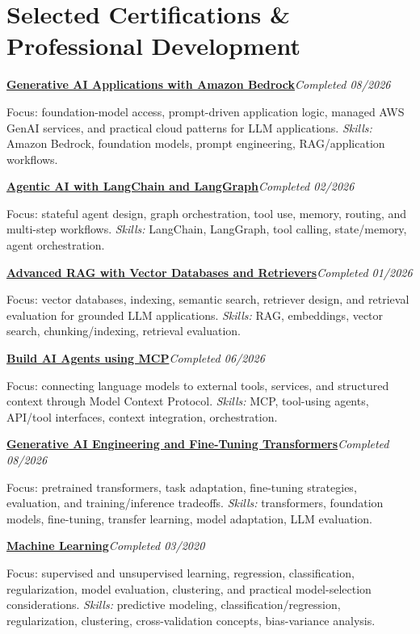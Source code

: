 \documentclass[9pt,letterpaper]{extarticle}
\newcommand{\cert}[3]{\Needspace{4\baselineskip}\textbf{#1}\hfill\textit{#2}\par{\small #3\par}}
\begin{document}
\section{Selected Certifications \& Professional Development}
\cert{\href{https://www.coursera.org/account/accomplishments/verify/3W16P8EE4BJZ}{Generative AI Applications with Amazon Bedrock}}{Completed 08/2026}{Focus: foundation-model access, prompt-driven application logic, managed AWS GenAI services, and practical cloud patterns for LLM applications. \textit{Skills:} Amazon Bedrock, foundation models, prompt engineering, RAG/application workflows.}
\cert{\href{https://www.coursera.org/account/accomplishments/verify/L4EY4SLGCPUE}{Agentic AI with LangChain and LangGraph}}{Completed 02/2026}{Focus: stateful agent design, graph orchestration, tool use, memory, routing, and multi-step workflows. \textit{Skills:} LangChain, LangGraph, tool calling, state/memory, agent orchestration.}
\cert{\href{https://www.coursera.org/account/accomplishments/verify/AH57KRK80TBQ}{Advanced RAG with Vector Databases and Retrievers}}{Completed 01/2026}{Focus: vector databases, indexing, semantic search, retriever design, and retrieval evaluation for grounded LLM applications. \textit{Skills:} RAG, embeddings, vector search, chunking/indexing, retrieval evaluation.}
\cert{\href{https://www.coursera.org/account/accomplishments/verify/QWAQ3NL4TGSZ}{Build AI Agents using MCP}}{Completed 06/2026}{Focus: connecting language models to external tools, services, and structured context through Model Context Protocol. \textit{Skills:} MCP, tool-using agents, API/tool interfaces, context integration, orchestration.}
\cert{\href{https://www.coursera.org/account/accomplishments/verify/SG4GDJ4CLPVL}{Generative AI Engineering and Fine-Tuning Transformers}}{Completed 08/2026}{Focus: pretrained transformers, task adaptation, fine-tuning strategies, evaluation, and training/inference tradeoffs. \textit{Skills:} transformers, foundation models, fine-tuning, transfer learning, model adaptation, LLM evaluation.}

\cert{\href{https://www.coursera.org/account/accomplishments/verify/VU3Y5TBLVLZT}{Machine Learning}}{Completed 03/2020}{Focus: supervised and unsupervised learning, regression, classification, regularization, model evaluation, clustering, and practical model-selection considerations. \textit{Skills:} predictive modeling, classification/regression, regularization, clustering, cross-validation concepts, bias-variance analysis.}
\end{document}

